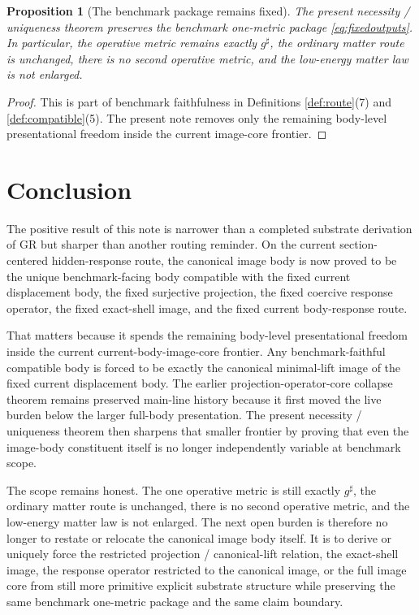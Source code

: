 \documentclass[11pt]{article}
\newcommand{\CompletedMetric}{g^{\sharp}}
\newtheorem{proposition}{Proposition}
\begin{document}
\begin{proposition}[The benchmark package remains fixed]
\label{prop:benchmark}
The present necessity / uniqueness theorem preserves the benchmark one-metric package \eqref{eq:fixedoutputs}. In particular, the operative metric remains exactly \(\CompletedMetric\), the ordinary matter route is unchanged, there is no second operative metric, and the low-energy matter law is not enlarged.
\end{proposition}

\begin{proof}
This is part of benchmark faithfulness in Definitions \ref{def:route}(7) and \ref{def:compatible}(5). The present note removes only the remaining body-level presentational freedom inside the current image-core frontier.
\end{proof}

\section{Conclusion}

The positive result of this note is narrower than a completed substrate derivation of GR but sharper than another routing reminder. On the current section-centered hidden-response route, the canonical image body is now proved to be the unique benchmark-facing body compatible with the fixed current displacement body, the fixed surjective projection, the fixed coercive response operator, the fixed exact-shell image, and the fixed current body-response route.

That matters because it spends the remaining body-level presentational freedom inside the current current-body-image-core frontier. Any benchmark-faithful compatible body is forced to be exactly the canonical minimal-lift image of the fixed current displacement body. The earlier projection-operator-core collapse theorem remains preserved main-line history because it first moved the live burden below the larger full-body presentation. The present necessity / uniqueness theorem then sharpens that smaller frontier by proving that even the image-body constituent itself is no longer independently variable at benchmark scope.

The scope remains honest. The one operative metric is still exactly \(\CompletedMetric\), the ordinary matter route is unchanged, there is no second operative metric, and the low-energy matter law is not enlarged. The next open burden is therefore no longer to restate or relocate the canonical image body itself. It is to derive or uniquely force the restricted projection / canonical-lift relation, the exact-shell image, the response operator restricted to the canonical image, or the full image core from still more primitive explicit substrate structure while preserving the same benchmark one-metric package and the same claim boundary.
\end{document}

